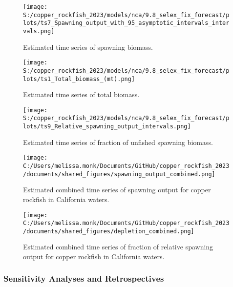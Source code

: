 \documentclass[
  letterpaper,
]{article}
\begin{document}
\begin{figure}
\centering
\texttt{[image: S:/copper\_rockfish\_2023/models/nca/9.8\_selex\_fix\_forecast/plots/ts7\_Spawning\_output\_with\_95\_asymptotic\_intervals\_intervals.png]}
\caption{Estimated time series of spawning biomass.\label{fig:ssb}}
\end{figure}

\pagebreak

\begin{figure}
\centering
\texttt{[image: S:/copper\_rockfish\_2023/models/nca/9.8\_selex\_fix\_forecast/plots/ts1\_Total\_biomass\_(mt).png]}
\caption{Estimated time series of total biomass.\label{fig:tot-bio}}
\end{figure}

\pagebreak

\begin{figure}
\centering
\texttt{[image: S:/copper\_rockfish\_2023/models/nca/9.8\_selex\_fix\_forecast/plots/ts9\_Relative\_spawning\_output\_intervals.png]}
\caption{Estimated time series of fraction of unfished spawning biomass.\label{fig:depl}}
\end{figure}

\pagebreak

\begin{figure}
\centering
\texttt{[image: C:/Users/melissa.monk/Documents/GitHub/copper\_rockfish\_2023/documents/shared\_figures/spawning\_output\_combined.png]}
\caption{Estimated combined time series of spawning output for copper rockfish in California waters.\label{fig:sb-all}}
\end{figure}

\clearpage

\begin{figure}
\centering
\texttt{[image: C:/Users/melissa.monk/Documents/GitHub/copper\_rockfish\_2023/documents/shared\_figures/depletion\_combined.png]}
\caption{Estimated combined time series of fraction of relative spawning output for copper rockfish in California waters.\label{fig:depl-all}}
\end{figure}

\clearpage

\hypertarget{sensitivity-analyses-and-retrospectives}{%
\subsubsection{Sensitivity Analyses and Retrospectives}\label{sensitivity-analyses-and-retrospectives}}
\end{document}
